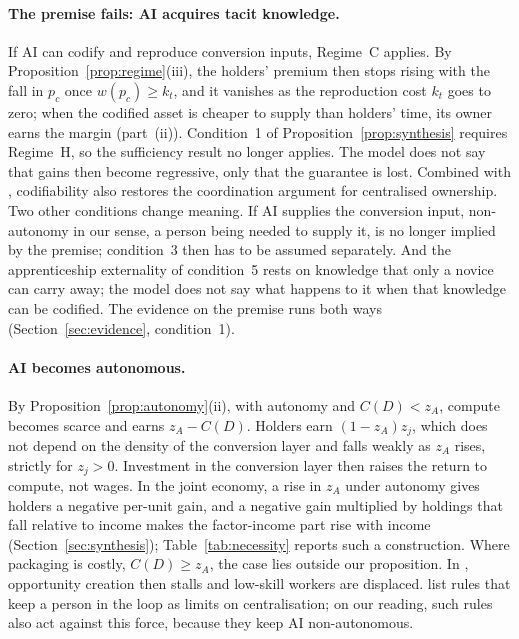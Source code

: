 \documentclass[12pt]{article}
\theoremstyle{remark}
\begin{document}
\paragraph{The premise fails: AI acquires tacit knowledge.} If AI can codify and reproduce conversion inputs, Regime~C applies. By Proposition~\ref{prop:regime}(iii), the holders' premium then stops rising with the fall in $p_c$ once $w(p_c)\ge k_t$, and it vanishes as the reproduction cost $k_t$ goes to zero; when the codified asset is cheaper to supply than holders' time, its owner earns the margin (part~(ii)). Condition~1 of Proposition~\ref{prop:synthesis} requires Regime~H, so the sufficiency result no longer applies. The model does not say that gains then become regressive, only that the guarantee is lost. Combined with \citet[\S12.4.3, pp.~310--311]{brynjolfsson2026hayek}, codifiability also restores the coordination argument for centralised ownership. Two other conditions change meaning. If AI supplies the conversion input, non-autonomy in our sense, a person being needed to supply it, is no longer implied by the premise; condition~3 then has to be assumed separately. And the apprenticeship externality of condition~5 rests on knowledge that only a novice can carry away; the model does not say what happens to it when that knowledge can be codified. The evidence on the premise runs both ways (Section~\ref{sec:evidence}, condition~1).

\paragraph{AI becomes autonomous.} By Proposition~\ref{prop:autonomy}(ii), with autonomy and $C(D)<z_A$, compute becomes scarce and earns $z_A-C(D)$. Holders earn $(1-z_A)z_j$, which does not depend on the density of the conversion layer and falls weakly as $z_A$ rises, strictly for $z_j>0$. Investment in the conversion layer then raises the return to compute, not wages. In the joint economy, a rise in $z_A$ under autonomy gives holders a negative per-unit gain, and a negative gain multiplied by holdings that fall relative to income makes the factor-income part rise with income (Section~\ref{sec:synthesis}); Table~\ref{tab:necessity} reports such a construction. Where packaging is costly, $C(D)\ge z_A$, the case lies outside our proposition. In \citet[p.~35]{garicano2026comment}, opportunity creation then stalls and low-skill workers are displaced. \citet[p.~318]{brynjolfsson2026hayek} list rules that keep a person in the loop as limits on centralisation; on our reading, such rules also act against this force, because they keep AI non-autonomous.
\end{document}
